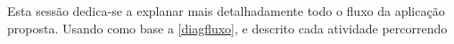 Esta sessão dedica-se a explanar mais detalhadamente todo o fluxo da aplicação proposta. Usando como base a \autoref{diagfluxo}, e descrito cada atividade percorrendo 
